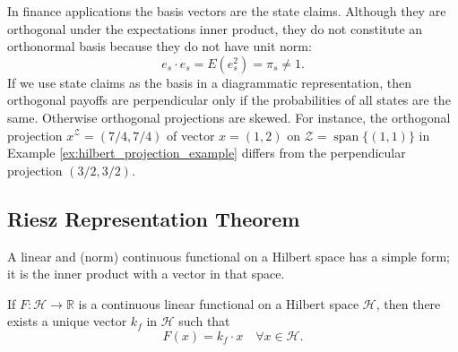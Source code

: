 \documentclass[\topdir/lecture\_notes.tex]{subfiles}
\begin{document}
In finance applications the basis vectors are the state claims. Although they are orthogonal under the expectations inner product, they do not constitute an orthonormal basis because they do not have unit norm:
\begin{equation*}
e_{s} \cdot e_{s}=E(e_{s}^{2})=\pi_{s} \neq 1. 
\end{equation*}
If we use state claims as the basis in a diagrammatic representation, then orthogonal payoffs are perpendicular only if the probabilities of all states are the same. Otherwise orthogonal projections are skewed. For instance, the orthogonal projection $x^{\mathcal{Z}}=(7/4, 7/4)$ of vector $x=(1,2)$ on $\mathcal{Z}=\operatorname{span}\{(1,1)\}$ in Example \ref{ex:hilbert_projection_example} differs from the perpendicular projection $(3/2, 3/2)$.

\subsection{Riesz Representation Theorem}
A linear and (norm) continuous functional on a Hilbert space has a simple form; it is the inner product with a vector in that space.
\begin{theorem}\label{thm:riesz_representation}
If $F: \mathcal{H} \rightarrow \mathbb{R}$ is a continuous linear functional on a Hilbert space $\mathcal{H}$, then there exists a unique vector $k_{f}$ in $\mathcal{H}$ such that
\begin{equation}
F(x)=k_{f} \cdot x \quad \forall x \in \mathcal{H}. \label{17.24}
\end{equation}
\end{theorem}
\end{document}
